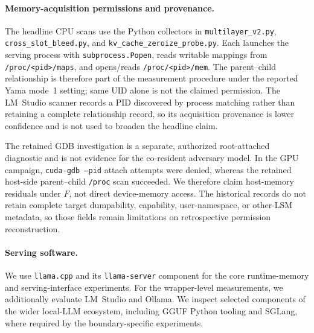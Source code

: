 \paragraph{Memory-acquisition permissions and provenance.}
The headline CPU scans use the Python collectors in
\texttt{multilayer\_v2.py}, \texttt{cross\_slot\_bleed.py}, and
\texttt{kv\_cache\_zeroize\_probe.py}. Each launches the serving process with
\texttt{subprocess.Popen}, reads writable mappings from
\texttt{/proc/<pid>/maps}, and opens/reads
\texttt{/proc/<pid>/mem}. The parent--child relationship is therefore part
of the measurement procedure under the reported Yama mode~1 setting; same
UID alone is not the claimed permission. The LM~Studio scanner records a
PID discovered by process matching rather than retaining a complete
relationship record, so its acquisition provenance is lower confidence and
is not used to broaden the headline claim.

The retained GDB investigation is a separate, authorized root-attached
diagnostic and is not evidence for the co-resident adversary model. In the
GPU campaign, \texttt{cuda-gdb --pid} attach attempts were denied, whereas
the retained host-side parent--child \texttt{/proc} scan succeeded. We therefore
claim host-memory residuals under $F$, not direct device-memory access. The
historical records do not retain complete target dumpability, capability,
user-namespace, or other-LSM metadata, so those fields remain limitations
on retrospective permission reconstruction.

\paragraph{Serving software.}
We use \texttt{llama.cpp} and its \texttt{llama-server} component for the
core runtime-memory and serving-interface experiments. For the
wrapper-level measurements, we additionally evaluate LM~Studio and
Ollama. We inspect selected components of the wider local-LLM ecosystem,
including GGUF Python tooling and SGLang, where required by the
boundary-specific experiments.

